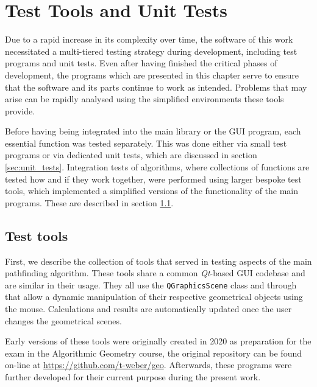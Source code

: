 %
%

\chapter{Test Tools and Unit Tests}
\label{ch:tests}
Due to a rapid increase in its complexity over time, the software of this work 
necessitated a multi-tiered testing strategy during development, including test programs and unit tests.
Even after having finished the critical phases of development, the programs which are 
presented in this chapter serve to ensure that the software and its parts continue to work as intended. 
Problems that may arise can be rapidly analysed using the simplified environments these tools provide.

Before having being integrated into the main library or the GUI program, each essential function was tested 
separately. This was done either via small test programs or via dedicated unit tests, which are discussed in 
section \ref{sec:unit_tests}.
Integration tests of algorithms, where collections of functions are tested how and if they work together, 
were performed using larger bespoke test tools, which implemented a simplified versions of the functionality 
of the main programs. These are described in section \ref{sec:tests_tools}.



\section{Test tools}
\label{sec:tests_tools}
First, we describe the collection of tools that served in testing aspects of the main pathfinding algorithm.
These tools share a common \textit{Qt}-based \cite{web_Qt} GUI codebase and are similar in their usage.
They all use the \lstinline[language=C++]|QGraphicsScene| class \cite{web_QGraphicsScene} and through that
allow a dynamic manipulation of their respective geometrical objects using the mouse. 
Calculations and results are automatically updated once the user changes the geometrical scenes.

Early versions of these tools were originally created in 2020 as preparation for the exam in the Algorithmic
Geometry course, the original repository can be found on-line at \url{https://github.com/t-weber/geo}. 
Afterwards, these programs were further developed for their current purpose during the present work.


